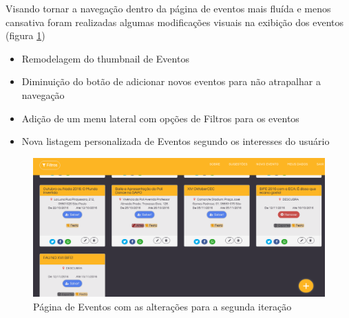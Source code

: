 \par Visando tornar a navegação dentro da página de eventos mais fluída e menos cansativa foram realizadas algumas modificações visuais na exibição dos eventos (figura \ref{fig:events_pagev2})
\begin{itemize}
\item Remodelagem do thumbnail de Eventos
\item Diminuição do botão de adicionar novos eventos para não atrapalhar a navegação
\item Adição de um menu lateral com opções de Filtros para os eventos
\item Nova listagem personalizada de Eventos segundo os interesses do usuário
\end{itemize}
        \begin{figure}[htb]
        \centering
		\includegraphics[width=15cm]{figuras/events_pagev2}
		\caption{\label{fig:events_pagev2} Página de Eventos com as alterações para a segunda iteração}
		\end{figure}


